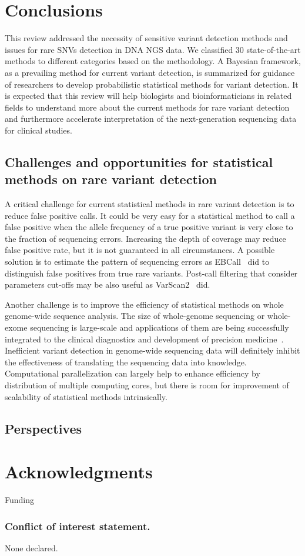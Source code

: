 \documentclass[a4,center,fleqn]{NAR}
\begin{document}
\section{Conclusions}

This review addressed the necessity of sensitive variant detection methods and issues for rare SNVs detection in DNA NGS data.
We classified 30 state-of-the-art methods to different categories based on the methodology.
A Bayesian framework, as a prevailing method for current variant detection, is summarized for guidance of researchers to develop probabilistic statistical methods for variant detection.
It is expected that this review will help biologists and bioinformaticians in related fields to understand more about the current methods for rare variant detection and furthermore accelerate interpretation of the next-generation sequencing data for clinical studies. 


\subsection{Challenges and opportunities for statistical methods on rare variant detection}

A critical challenge for current statistical methods in rare variant detection is to reduce false positive calls.
It could be very easy for a statistical method to call a false positive when the allele frequency of a true positive variant is very close to the fraction of sequencing errors.
Increasing the depth of coverage may reduce false positive rate, but it is not guaranteed in all circumstances.
A possible solution is to estimate the pattern of sequencing errors as EBCall~\citep{Shiraishi2013} did to distinguish false positives from true rare variants.
Post-call filtering that consider parameters cut-offs may be also useful as VarScan2~\citep{Koboldt2012} did.

Another challenge is to improve the efficiency of statistical methods on whole genome-wide sequence analysis.
The size of whole-genome sequencing or whole-exome sequencing is large-scale and applications of them are being successfully integrated to the clinical diagnostics and development of precision medicine~\citep{chiang2012exome, worthey2011making}.
Inefficient variant detection in genome-wide sequencing data will definitely inhibit the effectiveness of translating the sequencing data into knowledge.
Computational parallelization can largely help to enhance efficiency by distribution of multiple computing cores, but there is room for improvement of scalability of statistical methods intrinsically.



\subsection{Perspectives}




\section{Acknowledgments}
Funding




\subsubsection{Conflict of interest statement.} None declared.
\newpage



\end{document}
